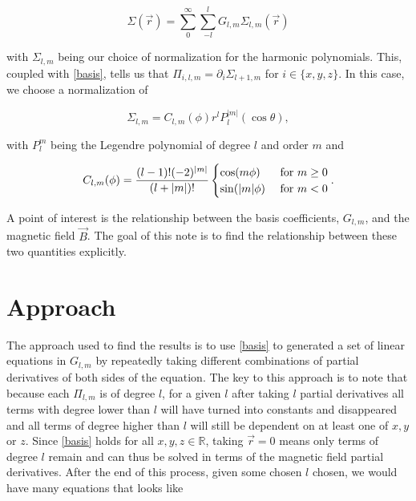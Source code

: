 \documentclass{article}
\begin{document}
\begin{equation}
    \Sigma(\vec r)=\sum_{0}^\infty\sum_{-l}^lG_{l,m}\Sigma_{l, m}(\vec r)
\end{equation}

with $\Sigma_{l, m}$ being our choice of normalization for the harmonic polynomials. This, coupled with \ref{basis}, tells us that $\Pi_{i, l, m}=\partial_i\Sigma_{l+1, m}$ for $i\in\{x, y, z\}$. In this case, we choose a normalization of

\begin{equation}
    \Sigma_{l, m}=C_{l, m}(\phi)r^lP_l^{|m|}(\cos\theta), 
\end{equation}

with $P_l^m$ being the Legendre polynomial of degree $l$ and order $m$ and

\begin{equation}
    C_{l, m}(\phi)=\frac{(l-1)!(-2)^{|m|}}{(l+|m|)!}\begin{cases}
        \cos(m\phi)&\textnormal{ for } m\geq0\\
        \sin(|m|\phi)&\textnormal{ for }m<0
    \end{cases}.
\end{equation}

A point of interest is the relationship between the basis coefficients, $G_{l, m}$, and the magnetic field $\vec B$. The goal of this note is to find the relationship between these two quantities explicitly. 

\section{Approach}

The approach used to find the results is to use \ref{basis} to generated a set of linear equations in $G_{l, m}$ by repeatedly taking different combinations of partial derivatives of both sides of the equation. The key to this approach is to note that because each $\Pi_{l,m}$ is of degree $l$, for a given $l$ after taking $l$ partial derivatives all terms with degree lower than $l$ will have turned into constants and disappeared and all terms of degree higher than $l$ will still be dependent on at least one of $x, y$ or $z$. Since \ref{basis} holds for all $x, y, z\in\mathbb{R}$, taking $\vec r=0$ means only terms of degree $l$ remain and can thus be solved in terms of the magnetic field partial derivatives. After the end of this process, given some chosen $l$ chosen, we would have many equations that looks like 
\end{document}
